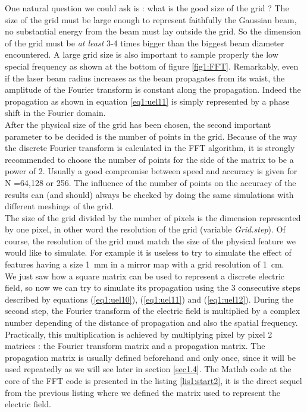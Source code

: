 One natural question we could ask is : what is the good size of the grid ? The size of the grid must be large enough to represent faithfully the Gaussian beam, no substantial energy from the beam must lay outside the grid. So the dimension of the grid must be \emph{at least} 3-4 times bigger than the biggest beam diameter encountered. A large grid size is also important to sample properly the low special frequency as shown at the bottom of figure \ref{fig1:FFT}. Remarkably, even if the laser beam radius increases as the beam propagates from its waist, the amplitude of the Fourier transform is constant along the propagation. Indeed the propagation as shown in equation \ref{eq1:uel11} is simply represented by a phase shift in the Fourier domain.\\

After the physical size of the grid has been chosen, the second important parameter to be decided is the number of points in the grid. Because of the way the discrete Fourier transform is calculated in the FFT algorithm, it is strongly recommended to choose the number of points for the side of the matrix to be a power of 2. Usually a good compromise between speed and accuracy is given for N =64,128 or 256. The influence of the number of points on the accuracy of the results can (and should) always be checked by doing the same simulations with different meshings of the grid.\\

The size of the grid divided by the number of pixels is the dimension represented by one pixel, in other word the resolution of the grid (variable \emph{Grid.step}). Of course, the resolution of the grid must match the size of the physical feature we would like to simulate. For example it is useless to try to simulate the effect of features having a size 1~mm in a mirror map with a grid resolution of 1~cm.\\


We just saw how a square matrix can be used to represent a discrete electric field, so now we can try to simulate its propagation using the 3 consecutive steps described by equations (\ref{eq1:uel10}), (\ref{eq1:uel11}) and (\ref{eq1:uel12}). During the second step, the Fourier transform of the electric field is multiplied by a complex number depending of the distance of propagation and also the spatial frequency. Practically, this multiplication is achieved by multiplying pixel by pixel 2 matrices : the Fourier transform matrix and a propagation matrix. The propagation matrix is usually defined beforehand and only once, since it will be used repeatedly as we will see later in section \ref{sec1.4}. The Matlab code at the core of the FFT code is presented in the listing \ref{lis1:start2}, it is the direct sequel from the previous listing where we defined the matrix used to represent the electric field.\\

